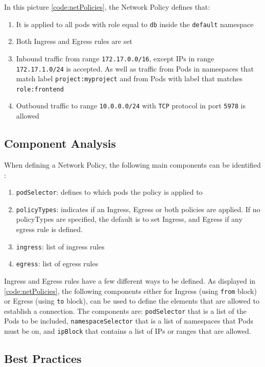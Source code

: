 \documentclass[a4paper,11pt,openright,BCOR=15mm]{scrbook}
\begin{document}
In this picture \ref{code:netPolicies}, the Network Policy defines that:

\begin{enumerate}
	\item It is applied to all pods with role equal to \texttt{db} inside the \texttt{default} namespace
	\item Both Ingress and Egress rules are set
	\item Inbound traffic from range \texttt{172.17.0.0/16}, except IPs in range \texttt{172.17.1.0/24} is accepted. As well as traffic from Pods in namespaces that match label \texttt{project:myproject} and from Pods with label that matches \texttt{role:frontend}
	\item Outbound traffic to range \texttt{10.0.0.0/24} with \texttt{TCP} protocol in port \texttt{5978} is allowed
\end{enumerate}

\subsection{Component Analysis}

When defining a Network Policy, the following main components can be identified \cite{amaechi_learn_2023}:

\begin{enumerate}
	\item \texttt{podSelector}: defines to which pods the policy is applied to
	\item \texttt{policyTypes}: indicates if an Ingress, Egress or both policies are applied. If no policyTypes are specified, the default is to set Ingress, and Egress if any egress rule is defined.
	\item \texttt{ingress}: list of ingress rules
	\item \texttt{egress}: list of egress rules
\end{enumerate}

Ingress and Egress rules have a few different ways to be defined. As displayed in \ref{code:netPolicies}, the following components either for Ingress (using \texttt{from} block) or Egress (using \texttt{to} block), can be used to define the elements that are allowed to establish a connection. The components are: \texttt{podSelector} that is a list of the Pods to be included, \texttt{namespaceSelector} that is a list of namespaces that Pods must be on, and \texttt{ipBlock} that contains a list of IPs or ranges that are allowed.

\subsection{Best Practices}
\end{document}
